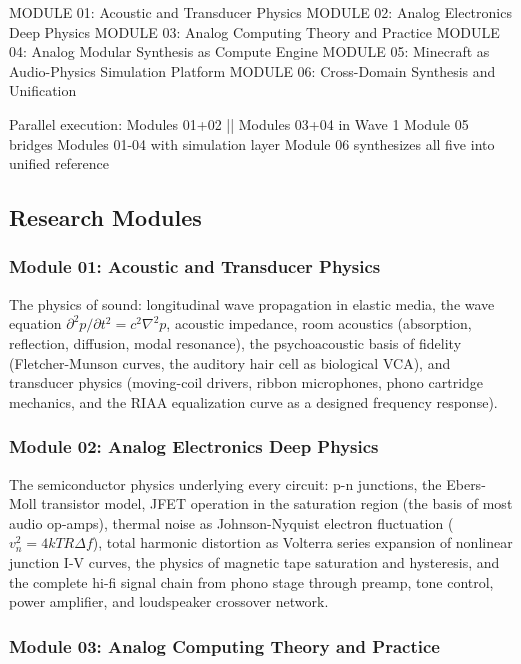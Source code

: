 \documentclass[11pt,letterpaper]{article}
\begin{document}
\begin{asciibox}
MODULE 01: Acoustic and Transducer Physics
MODULE 02: Analog Electronics Deep Physics
MODULE 03: Analog Computing Theory and Practice
MODULE 04: Analog Modular Synthesis as Compute Engine
MODULE 05: Minecraft as Audio-Physics Simulation Platform
MODULE 06: Cross-Domain Synthesis and Unification

Parallel execution: Modules 01+02 || Modules 03+04 in Wave 1
Module 05 bridges Modules 01-04 with simulation layer
Module 06 synthesizes all five into unified reference
\end{asciibox}

\subsection{Research Modules}

\subsubsection{Module 01: Acoustic and Transducer Physics}

The physics of sound: longitudinal wave propagation in elastic media, the wave equation $\partial^2 p / \partial t^2 = c^2 \nabla^2 p$, acoustic impedance, room acoustics (absorption, reflection, diffusion, modal resonance), the psychoacoustic basis of fidelity (Fletcher-Munson curves, the auditory hair cell as biological VCA), and transducer physics (moving-coil drivers, ribbon microphones, phono cartridge mechanics, and the RIAA equalization curve as a designed frequency response).

\subsubsection{Module 02: Analog Electronics Deep Physics}

The semiconductor physics underlying every circuit: p-n junctions, the Ebers-Moll transistor model, JFET operation in the saturation region (the basis of most audio op-amps), thermal noise as Johnson-Nyquist electron fluctuation ($v_n^2 = 4kTR\Delta f$), total harmonic distortion as Volterra series expansion of nonlinear junction I-V curves, the physics of magnetic tape saturation and hysteresis, and the complete hi-fi signal chain from phono stage through preamp, tone control, power amplifier, and loudspeaker crossover network.

\subsubsection{Module 03: Analog Computing Theory and Practice}
\end{document}
